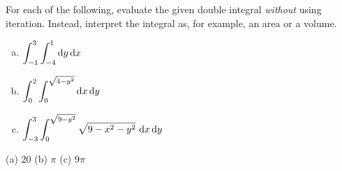 


\subsection*{\Conceptual}


\begin{question}
For each of the following, evaluate the given double integral 
\emph{without} using iteration. Instead, interpret the integral as, for
example, an area or a volume.
\begin{enumerate}[(a)]
\item
$\displaystyle\int_{-1}^3\int_{-4}^1 \mathrm{d}y\,\mathrm{d}x$
\item
$\displaystyle\int_0^2\int_0^{\sqrt{4-y^2}} \mathrm{d}x\,\mathrm{d}y$
\item
$\dst\int_{-3}^3\int_0^{\sqrt{9-y^2}}\sqrt{9-x^2-y^2}\ \dee{x}\,\dee{y}$
\end{enumerate}
\end{question}

%

\begin{answer}
(a) $20$\qquad
(b) $\pi$  \qquad
(c) $9\pi$
\end{answer}

